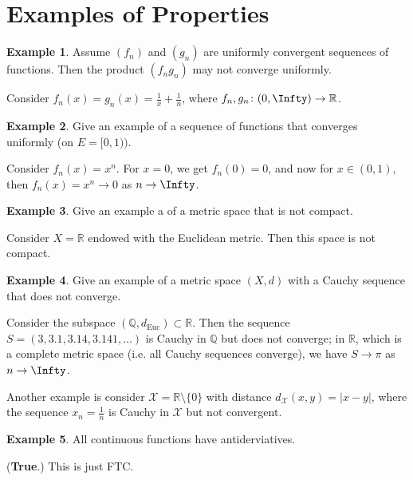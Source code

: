 \documentclass[oneside]{amsart}
\theoremstyle{definition}
\newtheorem{ex}{Example}[section]
\newcommand{\rr}{\mathbb R}
\newcommand{\qq}{\mathbb Q}
\begin{document}
\newpage 
\section{Examples of Properties}
\begin{ex}
Assume $(f_n)$ and $(g_n)$ are uniformly convergent sequences of functions. Then the product $(f_ng_n)$ may not converge uniformly. 

Consider $f_n(x) = g_n(x) = \frac{1}{x}+\frac{1}{n}$, where $f_n, g_n \colon (0, \Infty) \to \rr$.
\end{ex}

\begin{ex}
Give an example of a sequence of functions that converges uniformly 	(on $E = [0,1))$. 

Consider $f_n(x) = x^n$. For $x = 0$, we get $f_n(0) = 0$, and now for $x \in (0,1)$, then $f_n(x) = x^n \to 0$ as $n \to \Infty$. 
\end{ex}
\begin{ex}
Give an example a of a metric space that is not compact.

Consider $X = \rr$ endowed with the Euclidean metric. Then this space is not compact.	
\end{ex}


\begin{ex}
Give an example of a metric space $(X,d)$ with a Cauchy sequence that does not converge.

Consider the subspace $(\qq, d_{\text{Euc}}) \subset \rr$. Then the sequence $S = (3, 3.1, 3.14, 3.141, \ldots )$ is Cauchy in $\qq$ but does not converge; in $\rr$, which is a complete metric space (i.e. all Cauchy sequences converge), we have $S \to \pi $ as $n \to \Infty$.

Another example is consider $\mathcal X = \rr\setminus \{ 0 \}$ with distance $d_\mathcal X (x,y) = |x-y|$, where the sequence $x_n = \frac{1}{n}$ is Cauchy in $\mathcal X$ but not convergent. 
\end{ex}
\begin{ex}
All continuous functions have antiderviatives.	

(\textbf{True}.) This is just FTC.
\end{ex}
\end{document}
